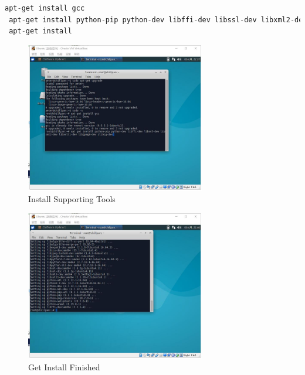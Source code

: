 \documentclass[12pt,a4paper]{article}
\begin{document}
\begin{lstlisting}[language = C]
 apt-get install gcc 
 apt-get install python-pip python-dev libffi-dev libssl-dev libxml2-dev libxslt1-dev zlibig-dev
 apt-get install 
\end{lstlisting}

\begin{minipage}{0.5\textwidth}
	\begin{figure}[H]
		\centering
		\includegraphics[width= 0.7\textwidth]{./fig/3_install_gcc_python.jpg}
		\caption{Install Supporting Tools}
		\label{fig:install gcc }
	\end{figure}
\end{minipage}
\begin{minipage}{0.5\textwidth}
	\begin{figure}[H]
		\centering
		\includegraphics[width= 0.7\textwidth]{./fig/3_install_gcc_python_2.jpg}
		\caption{Get Install Finished}
		\label{fig:install gcc finished}
	\end{figure}
\end{minipage}
\end{document}
